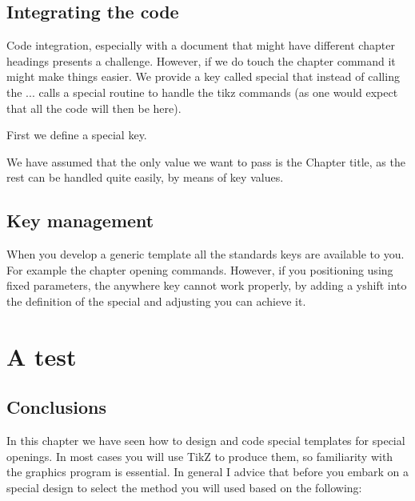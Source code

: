 \section{Integrating the code}

Code integration, especially with a document that might have different chapter headings presents a challenge. However, if we do touch the chapter command it might make things easier. We provide a key called special that instead of calling the \string\@make... calls a special
routine to handle the tikz commands (as one would expect that all the code will then be here).


First we define a special key.


\begin{teX}
\end{teX}

We have assumed that the only value we want to pass is the Chapter title, as the rest can be handled quite easily, by means of key values.

\section{Key management}

When you develop a generic template all the standards keys are available to you. For example the chapter opening commands. However, if you positioning using fixed parameters, the anywhere key cannot work properly, by adding a yshift into the definition of the special and adjusting you can achieve it.

\clearpage




\renewsection

\chapter{A test}

\section{Conclusions}

In this chapter we have seen how to design and code special templates for special openings. In most cases you will use TikZ to produce them, so familiarity with the graphics program is essential. In general I advice that before you embark on a special design to select the method you will used based on the following:

